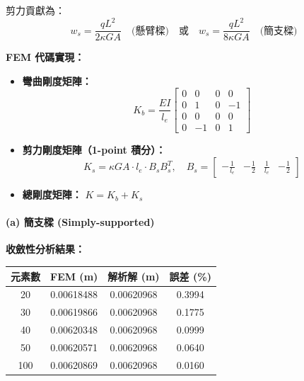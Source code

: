 \documentclass[UTF8, a4paper, 12pt]{ctexart}
\begin{document}
剪力貢獻為：
\begin{equation}
  w_s = \frac{qL^2}{2\kappa GA} \quad \text{(懸臂樑)} \quad \text{或} \quad w_s = \frac{qL^2}{8\kappa GA} \quad \text{(簡支樑)}
\end{equation}

\textbf{FEM 代碼實現：}
\begin{itemize}
  \item \textbf{彎曲剛度矩陣：}
  \begin{equation}
    K_b = \frac{EI}{l_e} \begin{bmatrix} 0 & 0 & 0 & 0 \\ 0 & 1 & 0 & -1 \\ 0 & 0 & 0 & 0 \\ 0 & -1 & 0 & 1 \end{bmatrix}
  \end{equation}
  \item \textbf{剪力剛度矩陣（1-point 積分）：}
  \begin{equation}
    K_s = \kappa GA \cdot l_e \cdot B_s B_s^T, \quad B_s = \begin{bmatrix} -\frac{1}{l_e} & -\frac{1}{2} & \frac{1}{l_e} & -\frac{1}{2} \end{bmatrix}
  \end{equation}
  \item \textbf{總剛度矩陣：} $K = K_b + K_s$
\end{itemize}

\paragraph{(a) 簡支樑 (Simply-supported)}

\textbf{收斂性分析結果：}

\begin{center}
\begin{tabular}{cccc}
\toprule
\textbf{元素數} & \textbf{FEM (m)} & \textbf{解析解 (m)} & \textbf{誤差 (\%)} \\
\midrule
20 & 0.00618488 & 0.00620968 & 0.3994 \\
30 & 0.00619866 & 0.00620968 & 0.1775 \\
40 & 0.00620348 & 0.00620968 & 0.0999 \\
50 & 0.00620571 & 0.00620968 & 0.0640 \\
100 & 0.00620869 & 0.00620968 & 0.0160 \\
\bottomrule
\end{tabular}
\end{center}
\end{document}
